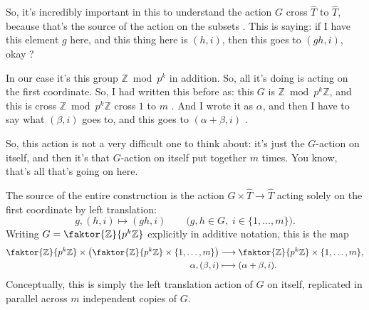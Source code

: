 \begin{proofWrapper}
\begin{speech}[00:47:01 - 00:48:14]
So, it's incredibly important in this to understand the action $G$ cross $\widehat{T}$ to $\widehat{T}$, because that's the source of the action on the subsets . This is saying: if I have this element $g$ here, and this thing here is $(h, i)$, then this goes to $(gh, i)$, okay ?

In our case it's this group $\mathbb{Z} \bmod p^k$ in addition. So, all it's doing is acting on the first coordinate. So, I had written this before as: this $G$ is $\mathbb{Z} \bmod p^k \mathbb{Z}$, and this is cross $\mathbb{Z} \bmod p^k \mathbb{Z}$ cross $1$ to $m$ . And I wrote it as $\alpha$, and then I have to say what $(\beta, i)$ goes to, and this goes to $(\alpha + \beta, i)$ .

So, this action is not a very difficult one to think about: it's just the $G$-action on itself, and then it's that $G$-action on itself put together $m$ times. You know, that's all that's going on here.
\end{speech}

\begin{content}
The source of the entire construction is the action $G \times \widehat{T} \to \widehat{T}$ acting solely on the first coordinate by left translation:
\[
g, (h, i) \longmapsto (gh, i) \qquad \bigl(g, h \in G,\; i \in \{1, \dots, m\}\bigr).
\]
Writing $G = \faktor{\mathbb{Z}}{p^k\mathbb{Z}}$ explicitly in additive notation, this is the map
\begin{align*}
\faktor{\mathbb{Z}}{p^k\mathbb{Z}} \times \left( \faktor{\mathbb{Z}}{p^k\mathbb{Z}} \times \{1, \dots, m\} \right) &\longrightarrow \faktor{\mathbb{Z}}{p^k\mathbb{Z}} \times \{1, \dots, m\}, \\
\alpha, (\beta, i) &\longmapsto (\alpha + \beta, i).
\end{align*}
Conceptually, this is simply the left translation action of $G$ on itself, replicated in parallel across $m$ independent copies of $G$.
\end{content}


\end{proofWrapper}
